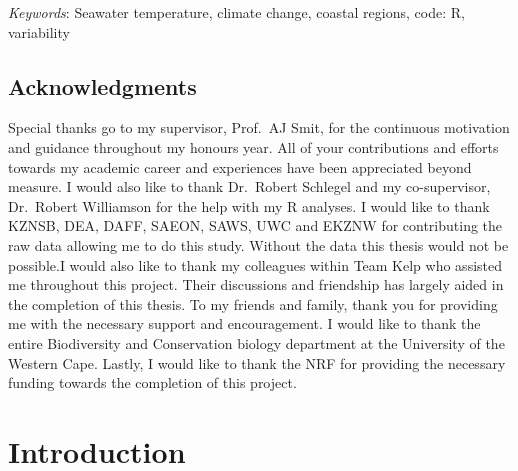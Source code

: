 \documentclass[12pt,a4paper,]{article}
\begin{document}
\emph{Keywords}: Seawater temperature, climate change, coastal regions,
code: R, variability

\newpage

\hypertarget{acknowledgments}{%
\subsection{Acknowledgments}\label{acknowledgments}}

Special thanks go to my supervisor, Prof.~AJ Smit, for the continuous
motivation and guidance throughout my honours year. All of your
contributions and efforts towards my academic career and experiences
have been appreciated beyond measure. I would also like to thank
Dr.~Robert Schlegel and my co-supervisor, Dr.~Robert Williamson for the
help with my R analyses. I would like to thank KZNSB, DEA, DAFF, SAEON,
SAWS, UWC and EKZNW for contributing the raw data allowing me to do this
study. Without the data this thesis would not be possible.I would also
like to thank my colleagues within Team Kelp who assisted me throughout
this project. Their discussions and friendship has largely aided in the
completion of this thesis. To my friends and family, thank you for
providing me with the necessary support and encouragement. I would like
to thank the entire Biodiversity and Conservation biology department at
the University of the Western Cape. Lastly, I would like to thank the
NRF for providing the necessary funding towards the completion of this
project.

\newpage

\hypertarget{introduction}{%
\section{Introduction}\label{introduction}}
\end{document}
